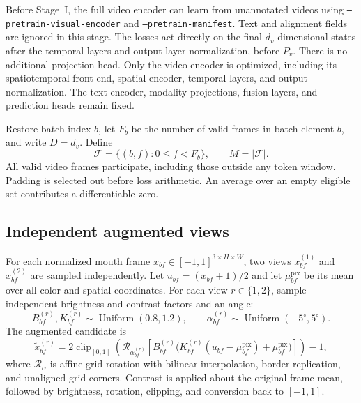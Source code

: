 \documentclass[11pt,a4paper]{article}
\newcommand{\clip}{\operatorname{clip}}
\numberwithin{equation}{section}
\begin{document}
Before Stage~I, the full video encoder can learn from unannotated videos
using \texttt{--pretrain-visual-encoder} and
\texttt{--pretrain-manifest}. Text and alignment fields are ignored in
this stage. The losses act directly on the final $d_v$-dimensional states
after the temporal layers and output layer normalization, before $P_v$.
There is no additional projection head. Only the video encoder is
optimized, including its spatiotemporal front end, spatial encoder,
temporal layers, and output normalization. The text encoder, modality
projections, fusion layers, and prediction heads remain fixed.

Restore batch index $b$, let $F_b$ be the number of valid frames in
batch element $b$, and write $D=d_v$. Define
\begin{equation}
\mathcal F=\{(b,f):0\leq f<F_b\},\qquad M=|\mathcal F|.
\end{equation}
All valid video frames participate, including those outside any token
window. Padding is selected out before loss arithmetic. An average over
an empty eligible set contributes a differentiable zero.

\subsection{Independent augmented views}

For each normalized mouth frame $x_{bf}\in[-1,1]^{3\times H\times W}$,
two views $x_{bf}^{(1)}$ and $x_{bf}^{(2)}$ are sampled independently.
Let $u_{bf}=(x_{bf}+1)/2$ and let $\mu_{bf}^{\mathrm{pix}}$ be its
mean over all color and spatial coordinates. For each view $r\in\{1,2\}$,
sample independent brightness and contrast factors and an angle:
\begin{equation}
B_{bf}^{(r)},K_{bf}^{(r)}\sim\operatorname{Uniform}(0.8,1.2),
\qquad
\alpha_{bf}^{(r)}\sim\operatorname{Uniform}(-5^\circ,5^\circ).
\end{equation}
The augmented candidate is
\begin{equation}
\widetilde x_{bf}^{(r)}
=2\clip_{[0,1]}\!\left(
 \mathcal R_{\alpha_{bf}^{(r)}}\!\left[
 B_{bf}^{(r)}\bigl(K_{bf}^{(r)}(u_{bf}-\mu_{bf}^{\mathrm{pix}})
                      +\mu_{bf}^{\mathrm{pix}}\bigr)\right]
\right)-1,
\label{eq:pretrain-augmentation}
\end{equation}
where $\mathcal R_\alpha$ is affine-grid rotation with bilinear
interpolation, border replication, and unaligned grid corners. Contrast
is applied about the original frame mean, followed by brightness,
rotation, clipping, and conversion back to $[-1,1]$.
\end{document}
